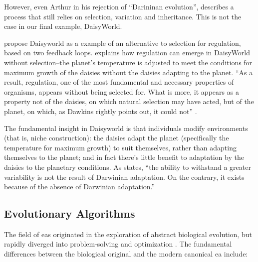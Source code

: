 However, even Arthur in his rejection of ``Darininan evolution'', describes a process that still relies on selection, variation and inheritance. This is not the case in our final example, DaisyWorld.

\Textcite{LovelockMargulis2011} propose Daisyworld as a example of an alternative to selection for regulation, based on two feedback loops. \Textcite{Saunders1994} explains how regulation can emerge in DaisyWorld without selection--the planet's temperature is adjusted to meet the conditions for maximum growth of the daisies without the daisies adapting to the planet. ``As a result, regulation, one of the most fundamental and necessary properties of organisms, appears without being selected for. What is more, it appears as a property not of the daisies, on which natural selection may have acted, but of the planet, on which, as Dawkins rightly points out, it could not'' \parencite{Saunders1994}.

The fundamental insight in Daisyworld is that individuals modify environments (that is, niche construction): the daisies adapt the planet (specifically the temperature for maximum growth) to suit themselves, rather than adapting themselves to the planet; and in fact there's little benefit to adaptation by the daisies to the planetary conditions. As \textcite{Saunders1994} states, ``the ability to withstand a greater variability is not the result of Darwinian adaptation. On the contrary, it exists because of the absence of Darwinian adaptation.''

\subsection{Evolutionary Algorithms}\label{ea}

The field of \glspl{ea} originated in the exploration of abstract biological evolution, but rapidly diverged into problem-solving and optimization \parencite{De-Jong:1993gy,DeJong2006}. The fundamental differences between the biological original and the modern canonical \gls{ea} include:

